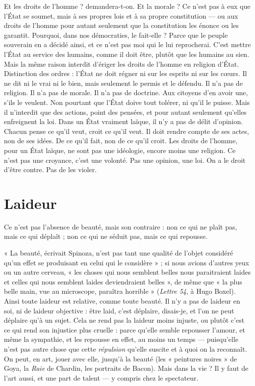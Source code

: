 {Et les droits de l’homme ? demandera-t-on. Et la morale ? Ce n’est pas à
eux que l’État se soumet, mais à ses propres lois et à sa propre constitution — ou
aux droits de l’homme pour autant seulement que la constitution les énonce ou
les garantit. Pourquoi, dans nos démocraties, le fait-elle ? Parce que le peuple
souverain en a décidé ainsi, et ce n’est pas moi qui le lui reprocherai. C'est
mettre l’État au service des humains, comme il doit être, plutôt que les
humains au sien. Mais la même raison interdit d’ériger les droits de l’homme
en religion d’État. Distinction des ordres : l’État ne doit régner ni sur les esprits
ni sur les cœurs. Il ne dit ni le vrai ni le bien, mais seulement le permis et le
défendu. Il n’a pas de religion. Il n’a pas de morale. Il n’a pas de doctrine. Aux
citoyens d’en avoir une, s'ils le veulent. Non pourtant que l’État doive tout
tolérer, ni qu’il le puisse. Mais il n’interdit que des actions, point des pensées,
et pour autant seulement qu’elles enfreignent la loi. Dans un État vraiment
laïque, il n’y a pas de délit d'opinion. Chacun pense ce qu’il veut, croit ce qu’il
veut. Il doit rendre compte de ses actes, non de ses idées. De ce qu’il fait, non
de ce qu’il croit. Les droits de l’homme, pour un État laïque, ne sont pas une
idéologie, encore moins une religion. Ce n’est pas une croyance, c’est une
volonté. Pas une opinion, une loi. On a le droit d’être contre. Pas de les violer.

\section{Laideur}
Ce n’est pas l’absence de beauté, mais son contraire : non ce qui
ne plaît pas, mais ce qui déplaît ; non ce qui ne séduit pas, mais
ce qui repousse.

« La beauté, écrivait Spinoza, n’est pas tant une qualité de l’objet considéré
qu'un effet se produisant en celui qui le considère » ; si nous avions d’autres
yeux ou un autre cerveau, « les choses qui nous semblent belles nous paraitraient
laides et celles qui nous semblent laides deviendraient belles », de même
que « la plus belle main, vue au microscope, paraîtra horrible » ({\it Lettre 54}, à
Hugo Boxel). Ainsi toute laideur est relative, comme toute beauté. Il n’y a pas
de laideur en soi, ni de laideur objective : être laid, c’est déplaire, disais-je, et
l’on ne peut déplaire qu’à un sujet. Cela ne rend pas la laideur moins injuste,
ou plutôt c’est ce qui rend son injustice plus cruelle : parce qu’elle semble
repousser l’amour, et même la sympathie, et les repousse en effet, au moins un
temps — puisqu'elle n’est pas autre chose que cette {\it répulsion} qu’elle suscite et à
quoi on la reconnaît. On peut, en art, jouer avec elle, jusqu’à la beauté (les
« peintures noires » de Goya, la {\it Raie} de Chardin, les portraits de Bacon). Mais
dans la vie ? Il y faut de l’art aussi, et une part de talent — y compris chez le
spectateur.

}
